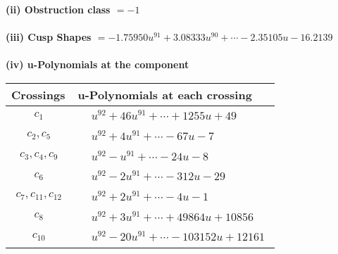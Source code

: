 \documentclass[1p]{elsarticle_modified}
\theoremstyle{definition}
\begin{document}
\flushleft \textbf{(ii) Obstruction class $= -1$}\\~\\
\flushleft \textbf{(iii) Cusp Shapes $= -1.75950 u^{91}+3.08333 u^{90}+\cdots-2.35105 u-16.2139$}\\~\\
\newpage\renewcommand{\arraystretch}{1}
\flushleft \textbf{(iv) u-Polynomials at the component}\newline \\
\begin{tabular}{m{50pt}|m{274pt}}
Crossings & \hspace{64pt}u-Polynomials at each crossing \\
\hline $$\begin{aligned}c_{1}\end{aligned}$$&$\begin{aligned}
&u^{92}+46 u^{91}+\cdots+1255 u+49
\end{aligned}$\\
\hline $$\begin{aligned}c_{2},c_{5}\end{aligned}$$&$\begin{aligned}
&u^{92}+4 u^{91}+\cdots-67 u-7
\end{aligned}$\\
\hline $$\begin{aligned}c_{3},c_{4},c_{9}\end{aligned}$$&$\begin{aligned}
&u^{92}- u^{91}+\cdots-24 u-8
\end{aligned}$\\
\hline $$\begin{aligned}c_{6}\end{aligned}$$&$\begin{aligned}
&u^{92}-2 u^{91}+\cdots-312 u-29
\end{aligned}$\\
\hline $$\begin{aligned}c_{7},c_{11},c_{12}\end{aligned}$$&$\begin{aligned}
&u^{92}+2 u^{91}+\cdots-4 u-1
\end{aligned}$\\
\hline $$\begin{aligned}c_{8}\end{aligned}$$&$\begin{aligned}
&u^{92}+3 u^{91}+\cdots+49864 u+10856
\end{aligned}$\\
\hline $$\begin{aligned}c_{10}\end{aligned}$$&$\begin{aligned}
&u^{92}-20 u^{91}+\cdots-103152 u+12161
\end{aligned}$\\
\hline
\end{tabular}\\~\\
\end{document}
